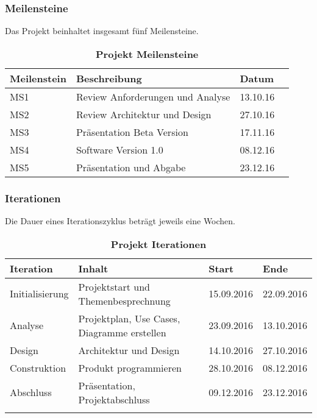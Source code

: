 \documentclass[a4,12pt]{scrartcl}
\begin{document}
\subsubsection{Meilensteine}
Das Projekt beinhaltet insgesamt fünf Meilensteine. \\
\begin{table}[H]
    \begin{tabular}{@{} l l l r@{}}\toprule    
    {Meilenstein} & {Beschreibung} & {Datum}\\ \midrule
    MS1 & Review Anforderungen und Analyse  & 13.10.16\\ \addlinespace
    MS2 & Review Architektur und Design & 27.10.16\\ \addlinespace
    MS3 & Präsentation Beta Version  & 17.11.16\\ \addlinespace
    MS4 & Software Version 1.0  & 08.12.16\\ \addlinespace
    MS5 & Präsentation und Abgabe & 23.12.16\\ 
    \bottomrule
    \end{tabular}
\caption{\textbf{Projekt Meilensteine}}
\end{table}


\subsubsection{Iterationen}
Die Dauer eines Iterationszyklus beträgt jeweils eine Wochen. 
\begin{table}[htb]
\centering
    \begin{tabular}{@{} p{3cm} l l l@{}}\toprule    
    {Iteration} & {Inhalt} & {Start} & {Ende}\\ \midrule
    Initialisierung & Projektstart und Themenbesprechnung & 15.09.2016  & 22.09.2016\\ \addlinespace
    Analyse & Projektplan, Use Cases, Diagramme erstellen  & 23.09.2016 & 13.10.2016\\ \addlinespace
    Design & Architektur und Design & 14.10.2016 & 27.10.2016\\ \addlinespace
    Construktion & Produkt programmieren & 28.10.2016  & 08.12.2016\\ \addlinespace
    Abschluss & Präsentation, Projektabschluss &  09.12.2016 & 23.12.2016\\ \addlinespace
    \bottomrule
    \end{tabular}
\caption{\textbf{Projekt Iterationen}}
\end{table}
\end{document}
